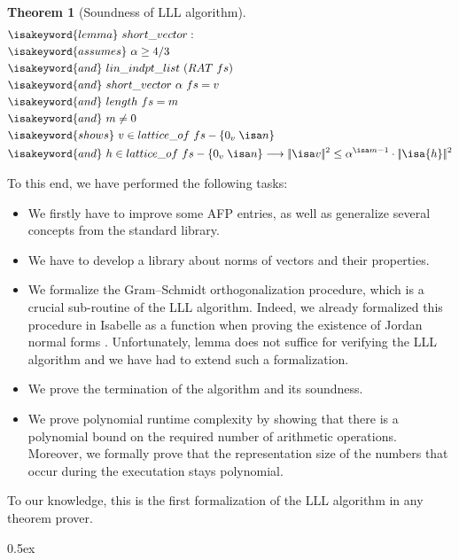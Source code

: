 \documentclass[11pt,a4paper]{article}
\newcommand\norm[1]{|\!|#1|\!|}
\newcommand\sqnorm[1]{\norm{#1}^2}
\newcommand\lemma{\isakeyword{lemma}\xspace}
\newcommand\assumes{\isakeyword{assumes}\xspace}
\newcommand\iand{\isakeyword{and}\xspace}
\newcommand\shows{\isakeyword{shows}}
\newtheorem{theorem}{Theorem}
\begin{document}
\begin{theorem}[Soundness of LLL algorithm]
\label{thm:LLL}
\begin{align*}
&\lemma\ short\_vector:\\
&\assumes\ \alpha \geq 4 / 3\\
&\iand\ lin\_indpt\_list\ (RAT\ fs)\\
&\iand\ short\_vector\ \alpha\ fs = v\\
&\iand\ length\ fs = m\\
&\iand\ m \neq 0\\
&\shows\ v \in lattice\_of\ fs - \{0_v\;\isa n\}\\
&\iand\ h \in lattice\_of\ fs - \{0_v\;\isa n\} \longrightarrow \sqnorm{\isa v} \leq \alpha^{\isa m-1} \cdot \sqnorm{\isa{h}}
\end{align*}
\end{theorem}

To this end, we have performed the following tasks:
\begin{itemize}
 \item We firstly have to improve some AFP entries, as well as generalize several concepts from the standard library.
 \item We have to develop a library about norms of vectors and their properties.
 \item We formalize the Gram--Schmidt orthogonalization 
      procedure, which is a crucial sub-routine of the LLL algorithm. 
      Indeed, we already formalized this procedure in Isabelle as a function  when proving
      the existence of Jordan normal forms \cite{ThiemannY16}. 
      Unfortunately, lemma  does not suffice for verifying the LLL algorithm and we have had to extend such a formalization. 
  \item We prove the termination of the algorithm and its soundness.
  \item We prove polynomial runtime complexity by showing that there is a polynomial bound
      on the required number of arithmetic operations. Moreover, we formally prove that the representation size 
      of the numbers
      that occur during the executation stays polynomial.
\end{itemize}

To our knowledge, this is the first formalization of the LLL algorithm in any theorem prover.


\parindent 0pt\parskip 0.5ex





\end{document}
